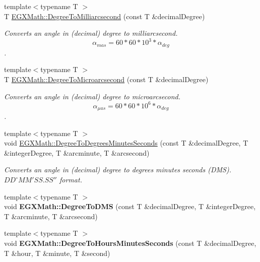 \begin{DoxyCompactItemize}
{\footnotesize template$<$typename T $>$ }\\T \mbox{\hyperlink{group___e_g_x_math-_angle_conversions-_degree_ga2c218e286b2ef72a00734dbc5a7f5ab6}{E\+G\+X\+Math\+::\+Degree\+To\+Milliarcsecond}} (const T \&decimal\+Degree)
\begin{DoxyCompactList}\small\item\em Converts an angle in (decimal) degree to milliarcsecond. \[\alpha_{mas}=60 * 60 * 10^3 * \alpha_{deg} \]. \end{DoxyCompactList}\item 
{\footnotesize template$<$typename T $>$ }\\T \mbox{\hyperlink{group___e_g_x_math-_angle_conversions-_degree_ga31b65388fe1b4656663b3d66b9d764e6}{E\+G\+X\+Math\+::\+Degree\+To\+Microarcsecond}} (const T \&decimal\+Degree)
\begin{DoxyCompactList}\small\item\em Converts an angle in (decimal) degree to microarcsecond. \[\alpha_{\mu as}=60 * 60 * 10^6 * \alpha_{deg}\]. \end{DoxyCompactList}\item 
{\footnotesize template$<$typename T $>$ }\\void \mbox{\hyperlink{group___e_g_x_math-_angle_conversions-_degree_ga859585939255d52d010c780c68eb6e23}{E\+G\+X\+Math\+::\+Degree\+To\+Degrees\+Minutes\+Seconds}} (const T \&decimal\+Degree, T \&integer\+Degree, T \&arcminute, T \&arcsecond)
\begin{DoxyCompactList}\small\item\em Converts an angle in (decimal) degree to degrees minutes seconds (D\+MS). ${DD}^{\circ}{MM}'{SS.SS}''$ format. \end{DoxyCompactList}\item 
\mbox{\label{group___e_g_x_math-_angle_conversions-_degree_ga1096d04647918e20f61fb184ba2a7dce}} 
{\footnotesize template$<$typename T $>$ }\\void {\bfseries E\+G\+X\+Math\+::\+Degree\+To\+D\+MS} (const T \&decimal\+Degree, T \&integer\+Degree, T \&arcminute, T \&arcsecond)
\item 
\mbox{\label{group___e_g_x_math-_angle_conversions-_degree_ga770b13da33b6f6c7bfa398cca7f24dbe}} 
{\footnotesize template$<$typename T $>$ }\\void {\bfseries E\+G\+X\+Math\+::\+Degree\+To\+Hours\+Minutes\+Seconds} (const T \&decimal\+Degree, T \&hour, T \&minute, T \&second)

\end{DoxyCompactItemize}

